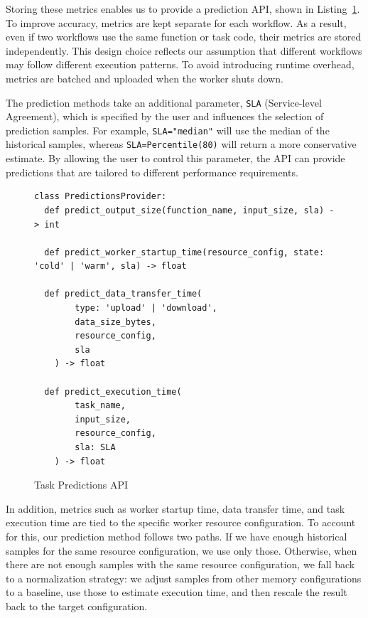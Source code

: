 Storing these metrics enables us to provide a prediction API, shown in Listing~\ref{lst:task_predictions_api}. To improve accuracy, metrics are kept separate for each workflow. As a result, even if two workflows use the same function or task code, their metrics are stored independently. This design choice reflects our assumption that different workflows may follow different execution patterns. To avoid introducing runtime overhead, metrics are batched and uploaded when the worker shuts down.

The prediction methods take an additional parameter, \texttt{SLA} (Service-level Agreement), which is specified by the user and influences the selection of prediction samples. For example, \texttt{SLA="median"} will use the median of the historical samples, whereas \texttt{SLA=Percentile(80)} will return a more conservative estimate. By allowing the user to control this parameter, the API can provide predictions that are tailored to different performance requirements.

\begin{figure}[h]
\centering
\begin{lstlisting}[basicstyle=\ttfamily\footnotesize, columns=fullflexible, breaklines=true]
class PredictionsProvider:
  def predict_output_size(function_name, input_size, sla) -> int

  def predict_worker_startup_time(resource_config, state: 'cold' | 'warm', sla) -> float

  def predict_data_transfer_time(
        type: 'upload' | 'download',
        data_size_bytes,
        resource_config,
        sla
    ) -> float

  def predict_execution_time(
        task_name,
        input_size,
        resource_config,
        sla: SLA
    ) -> float
\end{lstlisting}
\caption{Task Predictions API}
\label{lst:task_predictions_api}
\end{figure}

In addition, metrics such as worker startup time, data transfer time, and task execution time are tied to the specific worker resource configuration. To account for this, our prediction method follows two paths. If we have enough historical samples for the same resource configuration, we use only those. Otherwise, when there are not enough samples with the same resource configuration, we fall back to a normalization strategy: we adjust samples from other memory configurations to a baseline, use those to estimate execution time, and then rescale the result back to the target configuration. 

